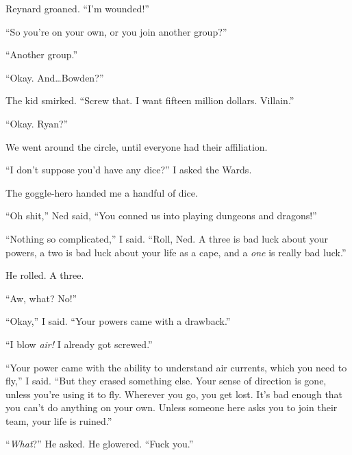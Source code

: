 Reynard groaned.  ``I'm wounded!''



``So you're on your own, or you join another group?''



``Another group.''



``Okay.  And\ldots Bowden?''



The kid smirked.  ``Screw that.  I want fifteen million dollars.  Villain.''



``Okay.  Ryan?''



We went around the circle, until everyone had their affiliation.



``I don't suppose you'd have any dice?'' I asked the Wards.



The goggle-hero handed me a handful of dice.



``Oh shit,'' Ned said, ``You conned us into playing dungeons and dragons!''



``Nothing so complicated,'' I said.  ``Roll, Ned.  A three is bad luck about your powers, a two is bad luck about your life as a cape, and a \emph{one} is really bad luck.''



He rolled.  A three.



``Aw, what?  No!''



``Okay,'' I said.  ``Your powers came with a drawback.''



``I blow \emph{air!}  I already got screwed.''



``Your power came with the ability to understand air currents, which you need to fly,'' I said.  ``But they erased something else.  Your sense of direction is gone, unless you're using it to fly.  Wherever you go, you get lost.  It's bad enough that you can't do anything on your own.  Unless someone here asks you to join their team, your life is ruined.''



``\emph{What}?''  He asked.  He glowered.  ``Fuck you.''



